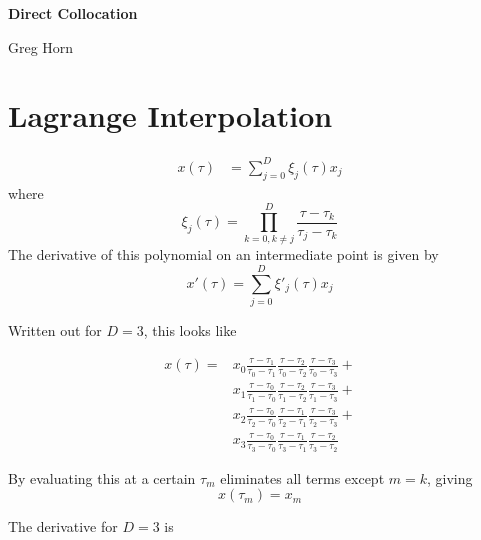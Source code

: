 \documentclass[a4paper,12pt]{article}
\newcommand{\myl}{\xi}
\newcommand{\myldot}{\myl'}
\newcommand{\taus}[3]{\frac{\tau_{#1}-\tau_{#2}}{\tau_{#3}-\tau_{#2}}}
\begin{document}
\sffamily
\begin{center}
\begin{LARGE}
{\bf Direct Collocation}\\
\vspace*{0.3cm}
\end{LARGE}\end{center}
\begin{center}
\begin{Large}
Greg Horn
\end{Large}

\end{center}
\vspace*{1cm}

\section{Lagrange Interpolation}
\begin{equation}
\begin{aligned}
x(\tau) &= \sum_{j=0}^D \myl_j(\tau) x_j
\end{aligned}
\label{eq:lagrange_interp_poly}
\end{equation}
where
\begin{equation}
\myl_j(\tau) = \prod_{k=0,k \neq j}^D\frac{\tau-\tau_k}{\tau_j-\tau_k}
\end{equation}
The derivative of this polynomial on an intermediate point is given by
\begin{equation}
x'(\tau) = \sum_{j=0}^D \myldot_j(\tau) x_j
\label{eq:lagrange_interp_poly_deriv}
\end{equation}

Written out for $D=3$, this looks like

\begin{align}
x(\tau) = & x_0 \taus{}{1}{0} \taus{}{2}{0} \taus{}{3}{0} + \\
          & x_1 \taus{}{0}{1} \taus{}{2}{1} \taus{}{3}{1} + \\
          & x_2 \taus{}{0}{2} \taus{}{1}{2} \taus{}{3}{2} + \\
          & x_3 \taus{}{0}{3} \taus{}{1}{3} \taus{}{2}{3}
\end{align}

By evaluating this at a certain $\tau_m$ eliminates all terms except $m=k$, giving
\begin{equation}
x(\tau_m) = x_m
\end{equation}

The derivative for $D=3$ is
\end{document}
